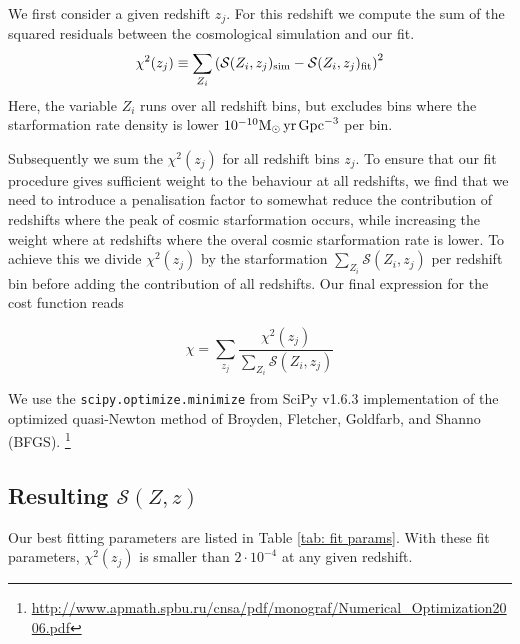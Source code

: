 \documentclass[twocolumn]{aastex631}
\newcommand{\Msun}{\ensuremath{\rm{M}_{\odot}}\xspace}
\newcommand{\yr}{\ensuremath{\,\rm{yr}}\xspace}
\newcommand{\Mpc}{\ensuremath{\,\rm{Gpc}}\xspace}
\newcommand{\SFRDzZ}{\ensuremath{\mathcal{S}(Z,z)}\xspace}
\begin{document}
We first consider a given redshift $z_j$.  For this redshift we compute the sum of the squared residuals between the cosmological simulation and our fit.  
%
\begin{equation}
\label{eq: chisquare}
    \chi^2 (z_j) \equiv \sum_{Z_i} \left( 
        \mathcal{S}(Z_i,z_j)_{\rm sim} - 
        \mathcal{S}(Z_i,z_j)_{\rm fit}\right)^2
\end{equation}
%
Here, the variable $Z_i$ runs over all redshift bins, but excludes bins where the starformation rate density is lower $10^{-10} \Msun \yr \Mpc^{-3}$ per bin. 

Subsequently we sum the $\chi^2 (z_j)$ for all redshift bins $z_j$. To ensure that our fit procedure gives sufficient weight to the behaviour at all redshifts, we find that we need to introduce a penalisation factor to somewhat reduce the contribution of redshifts where the peak of cosmic starformation occurs, while increasing the weight where at redshifts where the overal cosmic starformation rate is lower.  To achieve this we divide $\chi^2 (z_j)$ by the starformation $\sum_{Z_i} \mathcal{S}(Z_i,z_j)$ per redshift bin before adding the contribution of all redshifts.  Our final expression for the cost function reads

\begin{equation}
\label{eq: cost function}
    \chi  = \sum_{z_j} \frac{ \chi^2 (z_j) } 
        {\sum_{Z_i} \mathcal{S}(Z_i,z_j)}
\end{equation}

We use the \texttt{scipy.optimize.minimize} 
from SciPy v1.6.3 implementation of the optimized quasi-Newton method of Broyden, Fletcher, Goldfarb, and Shanno (BFGS). \footnote{\url{http://www.apmath.spbu.ru/cnsa/pdf/monograf/Numerical_Optimization2006.pdf}}


\subsection{Resulting \SFRDzZ}
Our best fitting parameters are listed in Table \ref{tab: fit params}. With these fit parameters, $\chi^2(z_j)$ is smaller than $2\cdot 10^{-4}$ at any given redshift.
\end{document}
